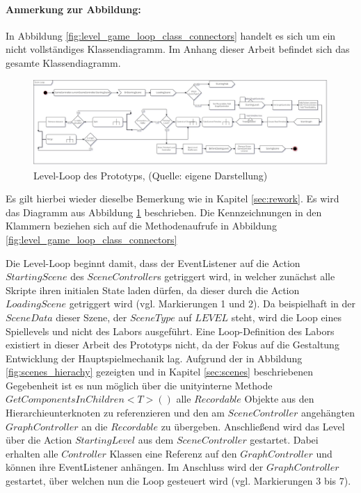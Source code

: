 \paragraph{Anmerkung zur Abbildung:}
In Abbildung \ref{fig:level_game_loop_class_connectors} handelt es sich um ein nicht vollständiges Klassendiagramm. Im Anhang dieser Arbeit befindet sich das gesamte Klassendiagramm.

\begin{figure}[ht]
\centering
\includegraphics[width=1\linewidth]{content/pictures/level-loop_prototype.jpg}
\caption{Level-Loop des Prototyps, (Quelle: eigene Darstellung)}
\label{fig:level_loop_prototype}
\end{figure}

Es gilt hierbei wieder dieselbe Bemerkung wie in Kapitel \ref{sec:rework}. Es wird das Diagramm aus Abbildung \ref{fig:level_loop_prototype}  beschrieben. Die Kennzeichnungen in den Klammern beziehen sich auf die Methodenaufrufe in Abbildung \ref{fig:level_game_loop_class_connectors} 

Die Level-Loop beginnt damit, dass der EventListener auf die Action $StartingScene$ des $SceneController$s getriggert wird, in welcher zunächst alle Skripte ihren initialen State laden dürfen, da dieser durch die Action $LoadingScene$ getriggert wird (vgl. Markierungen 1 und 2). Da beispielhaft in der $SceneData$ dieser Szene, der $SceneType$ auf $LEVEL$ steht, wird die Loop eines Spiellevels und nicht des Labors ausgeführt. Eine Loop-Definition des Labors existiert in dieser Arbeit des Prototyps nicht, da der Fokus auf die Gestaltung Entwicklung der Hauptspielmechanik lag. Aufgrund der in Abbildung \ref{fig:scenes_hierachy} gezeigten und in Kapitel \ref{sec:scenes} beschriebenen Gegebenheit ist es nun möglich über die unityinterne Methode $GetComponentsInChildren<T>()$ alle $Recordable$ Objekte aus den Hierarchieunterknoten zu referenzieren und den am $SceneController$ angehängten $GraphController$ an die $Recordable$ zu übergeben. Anschließend wird das Level über die Action $StartingLevel$ aus dem $SceneController$ gestartet. Dabei erhalten alle $Controller$ Klassen eine Referenz auf den $GraphController$ und können ihre EventListener anhängen. Im Anschluss wird der $GraphController$ gestartet, über welchen nun die Loop gesteuert wird (vgl. Markierungen 3 bis 7).

